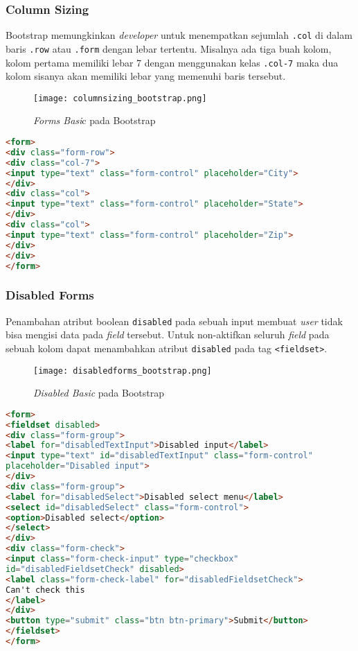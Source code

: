 \subsubsection{Column Sizing}
Bootstrap memungkinkan \textit{developer} untuk menempatkan sejumlah \texttt{.col} di dalam baris \texttt{.row} atau \texttt{.form} dengan lebar tertentu. Misalnya ada tiga buah kolom, kolom pertama memiliki lebar 7 dengan menggunakan kelas \texttt{.col-7} maka dua kolom sisanya akan memiliki lebar yang  memenuhi baris tersebut.
\begin{figure} [H]
	\centering  
	\texttt{[image: columnsizing\_bootstrap.png]}  
	\caption{\textit{Forms Basi}c pada Bootstrap} 
	\label{fig:columnSizingBootstrap}
\end{figure} 
\begin{lstlisting}[language=HTML,  basicstyle=\ttfamily, frame=single, columns=fullflexible, keepspaces=true, breaklines=true, showstringspaces=false, label={lst:columnsizingBootstrap}, caption=Column sizing pada bootstrap 4.] 
<form>
<div class="form-row">
<div class="col-7">
<input type="text" class="form-control" placeholder="City">
</div>
<div class="col">
<input type="text" class="form-control" placeholder="State">
</div>
<div class="col">
<input type="text" class="form-control" placeholder="Zip">
</div>
</div>
</form>
\end{lstlisting}
\subsubsection{Disabled Forms}
Penambahan atribut boolean \texttt{disabled} pada sebuah input membuat \textit{user} tidak bisa mengisi data pada \textit{field} tersebut. Untuk non-aktifkan seluruh \textit{field} pada sebuah kolom dapat menambahkan atribut \texttt{disabled} pada tag \texttt{<fieldset>}.
\begin{figure} [H]
	\centering  
	\texttt{[image: disabledforms\_bootstrap.png]}  
	\caption{\textit{Disabled Basic} pada Bootstrap} 
	\label{fig:disabledFormBootstrap}
\end{figure}
\begin{lstlisting}[language=HTML,  basicstyle=\ttfamily, frame=single, columns=fullflexible, keepspaces=true, breaklines=true, showstringspaces=false, label={lst:disabledFormsBootstrap}, caption=Disabled forms pada bootstrap 4.]  
<form>
<fieldset disabled>
<div class="form-group">
<label for="disabledTextInput">Disabled input</label>
<input type="text" id="disabledTextInput" class="form-control"
placeholder="Disabled input">
</div>
<div class="form-group">
<label for="disabledSelect">Disabled select menu</label>
<select id="disabledSelect" class="form-control">
<option>Disabled select</option>
</select>
</div>
<div class="form-check">
<input class="form-check-input" type="checkbox" 
id="disabledFieldsetCheck" disabled>
<label class="form-check-label" for="disabledFieldsetCheck">
Can't check this
</label>
</div>
<button type="submit" class="btn btn-primary">Submit</button>
</fieldset>
</form>
\end{lstlisting}
